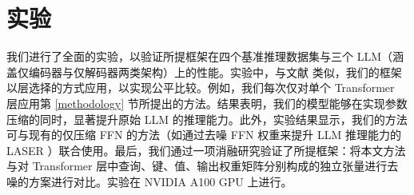 \documentclass[conference]{IEEEtran}
\begin{document}
\section{实验}
我们进行了全面的实验，以验证所提框架在四个基准推理数据集与三个 LLM（涵盖仅编码器与仅解码器两类架构）上的性能。实验中，与文献 \cite{sharma2023truth} 类似，我们的框架以层选择的方式应用，以实现公平比较。例如，我们每次仅对单个 Transformer 层应用第 \ref{methodology} 节所提出的方法。结果表明，我们的模型能够在实现参数压缩的同时，显著提升原始 LLM 的推理能力。此外，实验结果显示，我们的方法可与现有的仅压缩 FFN 的方法（如通过去噪 FFN 权重来提升 LLM 推理能力的 LASER \cite{sharma2023truth}）联合使用。最后，我们通过一项消融研究验证了所提框架：将本文方法与对 Transformer 层中查询、键、值、输出权重矩阵分别构成的独立张量进行去噪的方案进行对比。实验在 NVIDIA A100 GPU 上进行。
\end{document}
